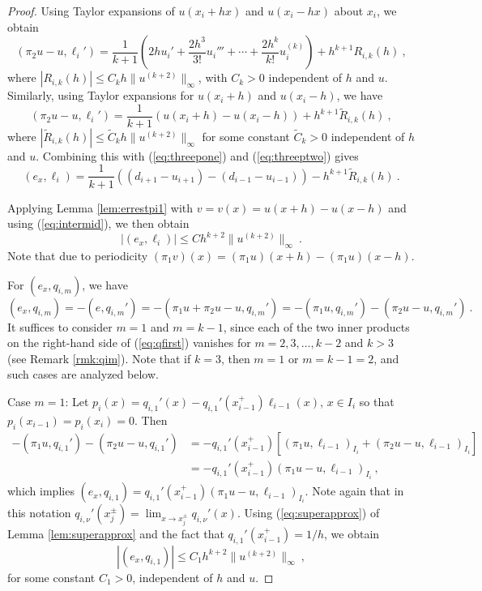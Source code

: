 \documentclass{amsart}
\begin{document}
\begin{proof}
Using Taylor expansions of $u(x_i+hx)$ and $u(x_i-hx)$ about $x_i$, we obtain
$$(\pi_2u-u,\ell_i')=\frac{1}{k+1}\left(2hu_i'+\frac{2h^3}{3!}u_i'''+\cdots+\frac{2h^k}{k!} u_i^{(k)}\right)+h^{k+1}R_{i,k}(h)\ ,$$
where $|R_{i,k}(h)|\leq C_k h \|u^{(k+2)}\|_\infty$, with $C_k>0$ independent of $h$ and $u$. 
%
Similarly, using Taylor expansions for $u(x_i+h)$ and $u(x_i-h)$, we have 
$$(\pi_2u-u,\ell_i')=\frac{1}{k+1}\left(u(x_i+h)-u(x_i-h) \right)+h^{k+1}\widetilde{R}_{i,k}(h)\ ,$$
where $|\widetilde{R}_{i,k}(h)|\leq \widetilde{C}_k h \|u^{(k+2)}\|_\infty$ for some constant $\widetilde{C}_k>0$ independent of $h$ and $u$.
%
Combining this with (\ref{eq:threepone}) and (\ref{eq:threeptwo}) gives
\begin{equation}\label{eq:intermid}
(e_x,\ell_i)=\frac{1}{k+1}\left((d_{i+1}-u_{i+1})-(d_{i-1}-u_{i-1}) \right)-h^{k+1} \widetilde{R}_{i,k}(h)\ .
\end{equation}

Applying Lemma \ref{lem:errestpi1} with $v=v(x)=u(x+h)-u(x-h)$ and using (\ref{eq:intermid}), we then obtain
$$|(e_x,\ell_i)|\leq Ch ^{k+2}\|u^{(k+2)}\|_\infty\ .$$
Note that due to periodicity $(\pi_1v)(x)=(\pi_1u)(x+h)-(\pi_1u)(x-h)$.

For $(e_x,q_{i,m})$, we have
\begin{equation}\label{eq:qfirst}
(e_x,q_{i,m})=-(e,q_{i,m}')=-(\pi_1 u+\pi_2u -u,q_{i,m}')=-(\pi_1u,q_{i,m}')-(\pi_2u-u,q_{i,m}')\ .
\end{equation}
It suffices to consider $m=1$ and $m=k-1$, since each of the two inner products on the right-hand side of (\ref{eq:qfirst}) vanishes for $m=2,3,\dots,k-2$ and $k>3$ (see Remark \ref{rmk:qim}). Note that if $k=3$, then $m=1$ or $m=k-1=2$, and such cases are analyzed below.

Case $m=1$: Let
$p_i(x)=q_{i,1}'(x)-q_{i,1}'(x_{i-1}^+)\ell_{i-1}(x)$,  $x\in I_i$
so that $p_i(x_{i-1})=p_i(x_i)=0$. Then
$$\begin{aligned}
-(\pi_1u,q_{i,1}')-(\pi_2u-u,q_{i,1}') &=-q_{i,1}'(x_{i-1}^+)\left[(\pi_1 u,\ell_{i-1})_{I_i}+(\pi_2u-u,\ell_{i-1})_{I_i} \right]\\
&=-q_{i,1}'(x_{i-1}^+)(\pi_1u-u,\ell_{i-1})_{I_i}\ ,
\end{aligned}$$
which implies
$(e_x,q_{i,1})=q_{i,1}'(x_{i-1}^+)(\pi_1 u-u,\ell_{i-1})_{I_{i}}$. 
%
Note again that in this notation 
$q_{i,\nu}'(x_j^{\pm})=\lim_{x\to x_j^{\pm}}q_{i,\nu}'(x)$.
%
Using (\ref{eq:superapprox}) of Lemma \ref{lem:superapprox} and the fact that $q_{i,1}'(x_{i-1}^+)=1/h$, we obtain
$$|(e_x,q_{i,1})|\leq C_1 h^{k+2}\|u^{(k+2)}\|_\infty\ ,$$
for some constant $C_1>0$, independent of $h$ and $u$.


\end{proof}
\end{document}
